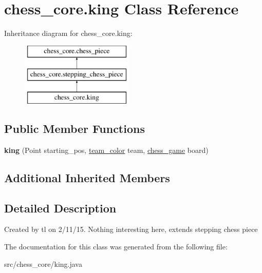 \hypertarget{classchess__core_1_1king}{}\section{chess\+\_\+core.\+king Class Reference}
\label{classchess__core_1_1king}
Inheritance diagram for chess\+\_\+core.\+king\+:\begin{figure}[H]
\begin{center}
\leavevmode
\includegraphics[height=3.000000cm]{classchess__core_1_1king}
\end{center}
\end{figure}
\subsection*{Public Member Functions}
\begin{DoxyCompactItemize}
\item 
\hypertarget{classchess__core_1_1king_a2005a51df2644082860009f9d0372ff3}{}{\bfseries king} (Point starting\+\_\+pos, \hyperlink{enumchess__core_1_1team__color}{team\+\_\+color} team, \hyperlink{classchess__core_1_1chess__game}{chess\+\_\+game} board)\label{classchess__core_1_1king_a2005a51df2644082860009f9d0372ff3}

\end{DoxyCompactItemize}
\subsection*{Additional Inherited Members}


\subsection{Detailed Description}
Created by tl on 2/11/15. Nothing interesting here, extends stepping chess piece 

The documentation for this class was generated from the following file\+:\begin{DoxyCompactItemize}
\item 
src/chess\+\_\+core/king.\+java\end{DoxyCompactItemize}
